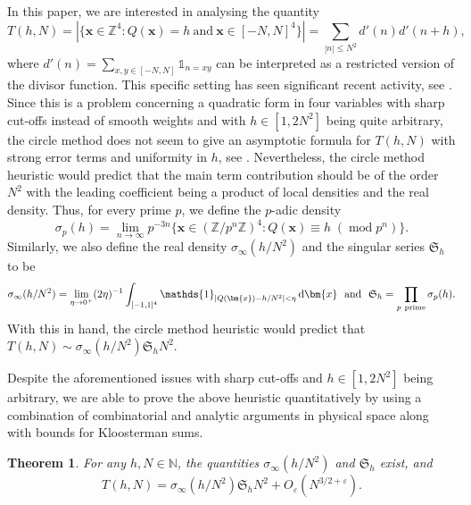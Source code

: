 \documentclass[12pt,reqno]{amsart}
\newtheorem{theorem}{Theorem}[section]
\theoremstyle{definition}
\theoremstyle{remark}
\numberwithin{equation}{section}
\DeclareMathOperator{\Mod}{mod}
\newcommand{\mmod}[1]{\;(\Mod{ #1})}
\renewcommand{\leq}{\leqslant}
\def\eps{\varepsilon}
\def\d{{\,{\rm d}}}
\newcommand\1{\mathds{1}}
\renewcommand\vec{\bm}
\begin{document}
In this paper, we are interested in analysing the quantity
\[ T(h,N) = |\{ \vec{x} \in \mathbb{Z}^4 : Q(\vec{x}) = h \ \text{and} \ \vec{x} \in [-N,N]^4 \}| = \sum_{|n| \leq N^2} d'(n) d'(n+h), \]
where $d'(n) = \sum_{x,y \in [-N,N]} \1_{n = xy}$ can be interpreted as a restricted version of the divisor function. This specific setting has seen significant recent activity, see \cite{Af2024, CM2025, CM2025b, DHP2025, GG2024, martin}. Since this is a problem concerning a quadratic form in four variables with  sharp cut-offs instead of smooth weights and with $h \in [1,2N^2]$ being quite arbitrary,  the circle method does not seem to give an asymptotic formula for $T(h,N)$ with strong error terms and uniformity in $h$, see \cite{Nie2010}. Nevertheless, the circle method heuristic would predict that the main term contribution should be of the order $N^2$ with the leading coefficient being a product of local densities and the real density. Thus, for every prime $p$, we define the $p$-adic density 
\[ \sigma_p(h) = \lim_{n \to \infty}p^{-3n} \{ \vec{x} \in (\mathbb{Z}/p^n \mathbb{Z})^4 : Q(\vec{x}) \equiv h \mmod{p^n} \}. \]
 Similarly, we also define the real density $\sigma_{\infty}(h/N^2)$ and the singular series $\mathfrak{S}_h$ to be
\[ \sigma_{\infty}(h/N^2) = \lim_{\eta \to 0^+} (2\eta)^{-1} \int_{[-1,1]^4} \1_{|Q(\vec{x}) - h/N^2| < \eta } \d \vec{x} \ \ \text{and}  \ \ \mathfrak{S}_h = \prod_{p \ \text{prime}} \sigma_p(h). \]
With this in hand, the circle method heuristic would predict that $T(h,N) \sim \sigma_{\infty}(h/N^2) \mathfrak{S}_h N^2$.

Despite the aforementioned issues with sharp cut-offs and $h \in [1,2N^2]$ being arbitrary, we are able to prove the above heuristic quantitatively by using a combination of combinatorial and analytic arguments in physical space along with bounds for Kloosterman sums.

\begin{theorem} \label{thm1.1}
    For any $h, N \in \mathbb{N}$, the quantities $\sigma_{\infty}(h/N^2)$ and $\mathfrak{S}_h$ exist, and 
    \[ T(h,N) = \sigma_{\infty}(h/N^2) \mathfrak{S}_h N^2 + O_{\eps}(N^{3/2 + \eps}).   \]
\end{theorem}
\end{document}
